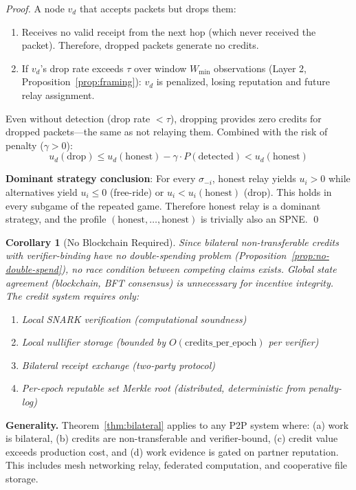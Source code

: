 \documentclass[11pt,a4paper]{article}
\newtheorem{corollary}[theorem]{Corollary}
\begin{document}
\begin{proof}
A node $v_d$ that accepts packets but drops them:
\begin{enumerate}[nosep]
    \item Receives no valid receipt from the next hop (which never received the packet). Therefore, dropped packets generate no credits.
    \item If $v_d$'s drop rate exceeds $\tau$ over window $W_{\min}$ observations (Layer 2, Proposition~\ref{prop:framing}): $v_d$ is penalized, losing reputation and future relay assignment.
\end{enumerate}

Even without detection (drop rate $< \tau$), dropping provides zero credits for dropped packets---the same as not relaying them. Combined with the risk of penalty ($\gamma > 0$):
\[
u_d(\text{drop}) \leq u_d(\text{honest}) - \gamma \cdot P(\text{detected}) < u_d(\text{honest})
\]

\textbf{Dominant strategy conclusion}: For every $\sigma_{-i}$, honest relay yields $u_i > 0$ while alternatives yield $u_i \leq 0$ (free-ride) or $u_i < u_i(\text{honest})$ (drop). This holds in every subgame of the repeated game. Therefore honest relay is a dominant strategy, and the profile $(\text{honest}, \ldots, \text{honest})$ is trivially also an SPNE. \qed
\end{proof}

\begin{corollary}[No Blockchain Required]
Since bilateral non-transferable credits with verifier-binding have no double-spending problem (Proposition~\ref{prop:no-double-spend}), no race condition between competing claims exists. Global state agreement (blockchain, BFT consensus) is unnecessary for incentive integrity. The credit system requires only:
\begin{enumerate}[nosep]
    \item Local SNARK verification (computational soundness)
    \item Local nullifier storage (bounded by $O(\text{credits\_per\_epoch})$ per verifier)
    \item Bilateral receipt exchange (two-party protocol)
    \item Per-epoch reputable set Merkle root (distributed, deterministic from penalty-log)
\end{enumerate}
\end{corollary}

\textbf{Generality.} Theorem~\ref{thm:bilateral} applies to any P2P system where: (a) work is bilateral, (b) credits are non-transferable and verifier-bound, (c) credit value exceeds production cost, and (d) work evidence is gated on partner reputation. This includes mesh networking relay, federated computation, and cooperative file storage.
\end{document}
